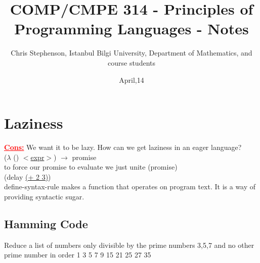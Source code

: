 \documentclass{article}
\begin{document}
\title{COMP/CMPE 314 - Principles of Programming Languages - Notes}
\author{Chris Stephenson, Istanbul Bilgi University, Department of Mathematics, and course students}
\date{April,14}
\maketitle

\section{Laziness}
\begin{flushleft}
\textcolor{red}{\textbf{\underline{Cons:}}} We want it to be lazy. How can we get laziness in an eager language?\\

\doublespacing
($\lambda$ () \underline{$<$expr$>$}) $\rightarrow$ promise\\
\doublespacing
to force our promise to evaluate we just unite (promise)\\
\doublespacing
(delay \underline{(+ 2 3)})\\
\doublespacing
define-syntax-rule makes a function that operates on program text. It is a way of providing syntactic sugar.
\end{flushleft}


\subsection*{Hamming Code}
\begin{flushleft}
Reduce a list of numbers only divisible by the prime numbers 3,5,7 and no other prime number in order 1  3  5  7  9  15  21  25  27  35
\end{flushleft}
\end{document}
